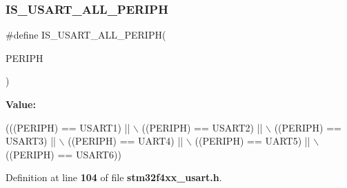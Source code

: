 \subsubsection{I\+S\+\_\+\+U\+S\+A\+R\+T\+\_\+\+A\+L\+L\+\_\+\+P\+E\+R\+I\+PH}
{\footnotesize\ttfamily \#define I\+S\+\_\+\+U\+S\+A\+R\+T\+\_\+\+A\+L\+L\+\_\+\+P\+E\+R\+I\+PH(\begin{DoxyParamCaption}\item[{}]{P\+E\+R\+I\+PH }\end{DoxyParamCaption})}

{\bfseries Value\+:}
\begin{DoxyCode}
(((PERIPH) == USART1) || \(\backslash\)
                                     ((PERIPH) == USART2) || \(\backslash\)
                                     ((PERIPH) == USART3) || \(\backslash\)
                                     ((PERIPH) == UART4)  || \(\backslash\)
                                     ((PERIPH) == UART5)  || \(\backslash\)
                                     ((PERIPH) == USART6))
\end{DoxyCode}


Definition at line \textbf{ 104} of file \textbf{ stm32f4xx\+\_\+usart.\+h}.

